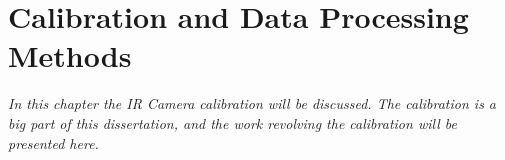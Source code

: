 \chapter{Calibration and Data Processing Methods}
\label{cap:setup}

\textit{In this chapter the IR Camera calibration will be discussed. The calibration is a big part of this dissertation, and the work revolving the calibration will be presented here.}


\cleardoublepage